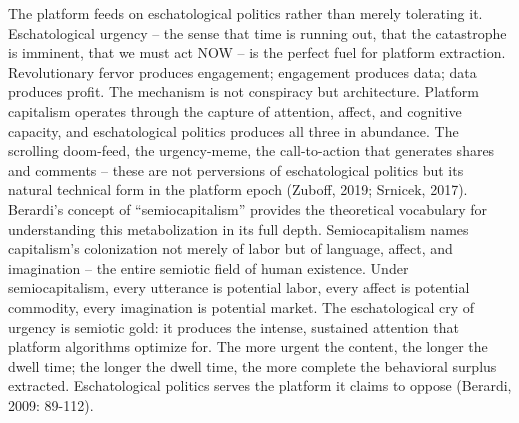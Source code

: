 The platform feeds on eschatological politics rather than merely tolerating it. Eschatological urgency – the sense that time is running out, that the catastrophe is imminent, that we must act NOW – is the perfect fuel for platform extraction. Revolutionary fervor produces engagement; engagement produces data; data produces profit. The mechanism is not conspiracy but architecture. Platform capitalism operates through the capture of attention, affect, and cognitive capacity, and eschatological politics produces all three in abundance. The scrolling doom-feed, the urgency-meme, the call-to-action that generates shares and comments – these are not perversions of eschatological politics but its natural technical form in the platform epoch (Zuboff, 2019; Srnicek, 2017). Berardi’s concept of “semiocapitalism” provides the theoretical vocabulary for understanding this metabolization in its full depth. Semiocapitalism names capitalism’s colonization not merely of labor but of language, affect, and imagination – the entire semiotic field of human existence. Under semiocapitalism, every utterance is potential labor, every affect is potential commodity, every imagination is potential market. The eschatological cry of urgency is semiotic gold: it produces the intense, sustained attention that platform algorithms optimize for. The more urgent the content, the longer the dwell time; the longer the dwell time, the more complete the behavioral surplus extracted. Eschatological politics serves the platform it claims to oppose (Berardi, 2009: 89-112).

